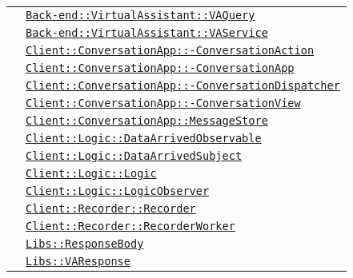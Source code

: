 \begin{longtable}{|>{\centering}m{3cm}|m{10cm}<{\centering}|}
& \hyperref[Back-end::VirtualAssistant::VAQuery]{\texttt{Back-end::VirtualAssistant::VAQuery}}\\
& \hyperref[Back-end::VirtualAssistant::VAService]{\texttt{Back-end::VirtualAssistant::VAService}}\\
& \hyperref[Client::ConversationApp::ConversationAction]{\texttt{Client::ConversationApp::-\linebreak ConversationAction}}\\
& \hyperref[Client::ConversationApp::ConversationApp]{\texttt{Client::ConversationApp::-\linebreak ConversationApp}}\\
& \hyperref[Client::ConversationApp::ConversationDispatcher]{\texttt{Client::ConversationApp::-\linebreak ConversationDispatcher}}\\
& \hyperref[Client::ConversationApp::ConversationView]{\texttt{Client::ConversationApp::-\linebreak ConversationView}}\\
& \hyperref[Client::ConversationApp::MessageStore]{\texttt{Client::ConversationApp::MessageStore}}\\
& \hyperref[Client::Logic::DataArrivedObservable]{\texttt{Client::Logic::DataArrivedObservable}}\\
& \hyperref[Client::Logic::DataArrivedSubject]{\texttt{Client::Logic::DataArrivedSubject}}\\
& \hyperref[Client::Logic::Logic]{\texttt{Client::Logic::Logic}}\\
& \hyperref[Client::Logic::LogicObserver]{\texttt{Client::Logic::LogicObserver}}\\
& \hyperref[Client::Recorder::Recorder]{\texttt{Client::Recorder::Recorder}}\\
& \hyperref[Client::Recorder::RecorderWorker]{\texttt{Client::Recorder::RecorderWorker}}\\
& \hyperref[Libs::ResponseBody]{\texttt{Libs::ResponseBody}}\\
& \hyperref[Libs::VAResponse]{\texttt{Libs::VAResponse}}\\ \hline


\end{longtable}
